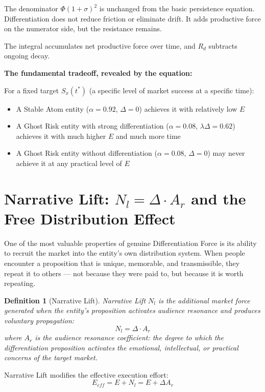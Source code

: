 \documentclass[12pt, openany]{book}
\theoremstyle{thmstyle}
\theoremstyle{defstyle}
\newtheorem{definition}{Definition}[chapter]
\begin{document}
The denominator $\Phi(1+\sigma)^2$ is unchanged from the basic persistence equation. Differentiation does not reduce friction or eliminate drift. It adds productive force on the numerator side, but the resistance remains.

The integral accumulates net productive force over time, and $R_d$ subtracts ongoing decay.

\textbf{The fundamental tradeoff, revealed by the equation:}

For a fixed target $S_x(t^*)$ (a specific level of market success at a specific time):
\begin{itemize}[leftmargin=1.5em]
  \item A Stable Atom entity ($\alpha = 0.92$, $\Delta = 0$) achieves it with relatively low $E$
  \item A Ghost Risk entity with strong differentiation ($\alpha = 0.08$, $\lambda\Delta = 0.62$) achieves it with much higher $E$ and much more time
  \item A Ghost Risk entity without differentiation ($\alpha = 0.08$, $\Delta = 0$) may never achieve it at any practical level of $E$
\end{itemize}

\section{Narrative Lift: $N_l = \Delta \cdot A_r$ and the Free Distribution Effect}

One of the most valuable properties of genuine Differentiation Force is its ability to recruit the market into the entity's own distribution system. When people encounter a proposition that is unique, memorable, and transmissible, they repeat it to others --- not because they were paid to, but because it is worth repeating.

\begin{definition}[Narrative Lift]
Narrative Lift $N_l$ is the additional market force generated when the entity's proposition activates audience resonance and produces voluntary propagation:
\begin{equation}
N_l = \Delta \cdot A_r
\label{eq:narrative_lift}
\end{equation}
where $A_r$ is the audience resonance coefficient: the degree to which the differentiation proposition activates the emotional, intellectual, or practical concerns of the target market.
\end{definition}

Narrative Lift modifies the effective execution effort:
\begin{equation}
E_{eff} = E + N_l = E + \Delta A_r
\label{eq:effective_effort}
\end{equation}
\end{document}
